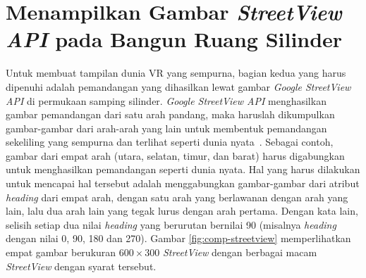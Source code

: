 \section{Menampilkan Gambar \textit{StreetView API} pada Bangun Ruang Silinder}
Untuk membuat tampilan dunia VR yang sempurna, bagian kedua yang harus dipenuhi adalah pemandangan yang dihasilkan lewat gambar \textit{Google StreetView API} di permukaan samping silinder. 
\textit{Google StreetView API} menghasilkan gambar pemandangan dari satu arah pandang, maka haruslah dikumpulkan gambar-gambar dari arah-arah yang lain untuk membentuk pemandangan sekeliling yang sempurna dan terlihat seperti dunia nyata~\cite{streetview-api}. Sebagai contoh, gambar dari empat arah (utara, selatan, timur, dan barat) harus digabungkan untuk menghasilkan pemandangan seperti  dunia nyata. Hal yang harus dilakukan untuk mencapai hal tersebut adalah menggabungkan gambar-gambar dari atribut \textit{heading} dari empat arah, dengan satu arah yang berlawanan dengan arah yang lain, lalu dua arah lain yang tegak lurus dengan arah pertama. Dengan kata lain, selisih setiap dua nilai \textit{heading} yang berurutan  bernilai 90 (misalnya \textit{heading} dengan nilai 0, 90, 180 dan 270). Gambar \ref{fig:comp-streetview} memperlihatkan empat gambar berukuran $600\times300$ \textit{StreetView} dengan berbagai macam \textit{StreetView} dengan syarat tersebut.

